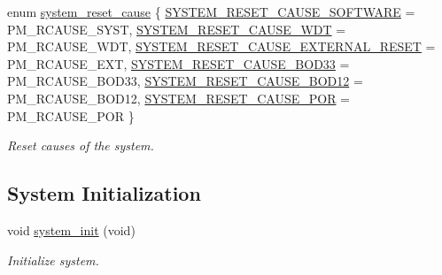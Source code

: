 \begin{DoxyCompactItemize}
enum \mbox{\hyperlink{group__asfdoc__sam0__system__group_gad1757cdfed2f30f012a3aec2e0f67ad3}{system\+\_\+reset\+\_\+cause}} \{ \newline
\mbox{\hyperlink{group__asfdoc__sam0__system__group_ggad1757cdfed2f30f012a3aec2e0f67ad3a8e5fb81626f25f1809ef477e51b433ce}{S\+Y\+S\+T\+E\+M\+\_\+\+R\+E\+S\+E\+T\+\_\+\+C\+A\+U\+S\+E\+\_\+\+S\+O\+F\+T\+W\+A\+RE}} = P\+M\+\_\+\+R\+C\+A\+U\+S\+E\+\_\+\+S\+Y\+ST, 
\mbox{\hyperlink{group__asfdoc__sam0__system__group_ggad1757cdfed2f30f012a3aec2e0f67ad3a79f22a7e3e5a4637623e953edefe3a10}{S\+Y\+S\+T\+E\+M\+\_\+\+R\+E\+S\+E\+T\+\_\+\+C\+A\+U\+S\+E\+\_\+\+W\+DT}} = P\+M\+\_\+\+R\+C\+A\+U\+S\+E\+\_\+\+W\+DT, 
\mbox{\hyperlink{group__asfdoc__sam0__system__group_ggad1757cdfed2f30f012a3aec2e0f67ad3ac053161d05ba5dc180fb4656e9f793f7}{S\+Y\+S\+T\+E\+M\+\_\+\+R\+E\+S\+E\+T\+\_\+\+C\+A\+U\+S\+E\+\_\+\+E\+X\+T\+E\+R\+N\+A\+L\+\_\+\+R\+E\+S\+ET}} = P\+M\+\_\+\+R\+C\+A\+U\+S\+E\+\_\+\+E\+XT, 
\mbox{\hyperlink{group__asfdoc__sam0__system__group_ggad1757cdfed2f30f012a3aec2e0f67ad3a5452f653acf6c46cd2dc4e04f4868814}{S\+Y\+S\+T\+E\+M\+\_\+\+R\+E\+S\+E\+T\+\_\+\+C\+A\+U\+S\+E\+\_\+\+B\+O\+D33}} = P\+M\+\_\+\+R\+C\+A\+U\+S\+E\+\_\+\+B\+O\+D33, 
\newline
\mbox{\hyperlink{group__asfdoc__sam0__system__group_ggad1757cdfed2f30f012a3aec2e0f67ad3a021769ef80b03d4f3f190366fe8d702f}{S\+Y\+S\+T\+E\+M\+\_\+\+R\+E\+S\+E\+T\+\_\+\+C\+A\+U\+S\+E\+\_\+\+B\+O\+D12}} = P\+M\+\_\+\+R\+C\+A\+U\+S\+E\+\_\+\+B\+O\+D12, 
\mbox{\hyperlink{group__asfdoc__sam0__system__group_ggad1757cdfed2f30f012a3aec2e0f67ad3a7dcc8589640fefe72b944ca51396f1bf}{S\+Y\+S\+T\+E\+M\+\_\+\+R\+E\+S\+E\+T\+\_\+\+C\+A\+U\+S\+E\+\_\+\+P\+OR}} = P\+M\+\_\+\+R\+C\+A\+U\+S\+E\+\_\+\+P\+OR
 \}
\begin{DoxyCompactList}\small\item\em Reset causes of the system. \end{DoxyCompactList}\end{DoxyCompactItemize}
\subsection*{System Initialization}
\begin{DoxyCompactItemize}
\item 
void \mbox{\hyperlink{group__asfdoc__sam0__system__group_ga43f5e0d6db0fb41a437cc9096b32e9b5}{system\+\_\+init}} (void)
\begin{DoxyCompactList}\small\item\em Initialize system. \end{DoxyCompactList}\end{DoxyCompactItemize}


